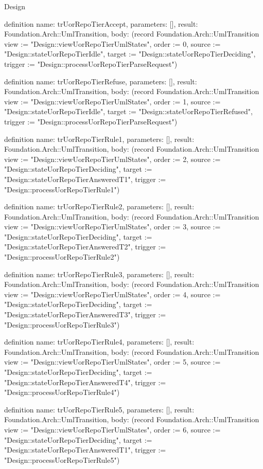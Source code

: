 \begin{lexlean}{Design}
\begin{semanticmodule}
definition{
  name: trUorRepoTierAccept,
  parameters: [],
  result: Foundation.Arch::UmlTransition,
  body: (record Foundation.Arch::UmlTransition {view := "Design::viewUorRepoTierUmlStates", order := 0, source := "Design::stateUorRepoTierIdle", target := "Design::stateUorRepoTierDeciding", trigger := "Design::processUorRepoTierParseRequest"})
}

definition{
  name: trUorRepoTierRefuse,
  parameters: [],
  result: Foundation.Arch::UmlTransition,
  body: (record Foundation.Arch::UmlTransition {view := "Design::viewUorRepoTierUmlStates", order := 1, source := "Design::stateUorRepoTierIdle", target := "Design::stateUorRepoTierRefused", trigger := "Design::processUorRepoTierParseRequest"})
}

definition{
  name: trUorRepoTierRule1,
  parameters: [],
  result: Foundation.Arch::UmlTransition,
  body: (record Foundation.Arch::UmlTransition {view := "Design::viewUorRepoTierUmlStates", order := 2, source := "Design::stateUorRepoTierDeciding", target := "Design::stateUorRepoTierAnsweredT1", trigger := "Design::processUorRepoTierRule1"})
}

definition{
  name: trUorRepoTierRule2,
  parameters: [],
  result: Foundation.Arch::UmlTransition,
  body: (record Foundation.Arch::UmlTransition {view := "Design::viewUorRepoTierUmlStates", order := 3, source := "Design::stateUorRepoTierDeciding", target := "Design::stateUorRepoTierAnsweredT2", trigger := "Design::processUorRepoTierRule2"})
}

definition{
  name: trUorRepoTierRule3,
  parameters: [],
  result: Foundation.Arch::UmlTransition,
  body: (record Foundation.Arch::UmlTransition {view := "Design::viewUorRepoTierUmlStates", order := 4, source := "Design::stateUorRepoTierDeciding", target := "Design::stateUorRepoTierAnsweredT3", trigger := "Design::processUorRepoTierRule3"})
}

definition{
  name: trUorRepoTierRule4,
  parameters: [],
  result: Foundation.Arch::UmlTransition,
  body: (record Foundation.Arch::UmlTransition {view := "Design::viewUorRepoTierUmlStates", order := 5, source := "Design::stateUorRepoTierDeciding", target := "Design::stateUorRepoTierAnsweredT4", trigger := "Design::processUorRepoTierRule4"})
}

definition{
  name: trUorRepoTierRule5,
  parameters: [],
  result: Foundation.Arch::UmlTransition,
  body: (record Foundation.Arch::UmlTransition {view := "Design::viewUorRepoTierUmlStates", order := 6, source := "Design::stateUorRepoTierDeciding", target := "Design::stateUorRepoTierAnsweredT1", trigger := "Design::processUorRepoTierRule5"})
}


\end{semanticmodule}
\end{lexlean}
